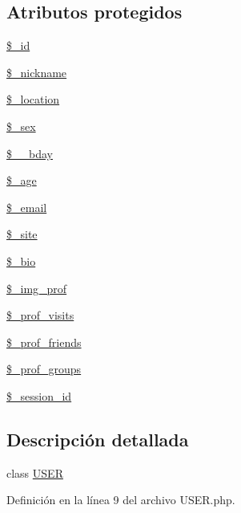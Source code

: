 \subsection*{Atributos protegidos}
\begin{DoxyCompactItemize}
\item 
\hyperlink{classUSER_a64da16c4a1c7b2dc6784f6ef26341ed7}{\$\-\_\-id}
\item 
\hyperlink{classUSER_a0791a0cc4f4f4676e8f4f94ba0516731}{\$\-\_\-nickname}
\item 
\hyperlink{classUSER_a8d591c38603c12640c6e3a6be8ad125d}{\$\-\_\-location}
\item 
\hyperlink{classUSER_a0daa294c691b0e2ab4878e2fc06b6706}{\$\-\_\-sex}
\item 
\hyperlink{classUSER_a45989f84816f9c5b99cc3b18dc23ba48}{\$\-\_\-\-\_\-bday}
\item 
\hyperlink{classUSER_a9c749fcfc61978947fbbffcb09e713c6}{\$\-\_\-age}
\item 
\hyperlink{classUSER_a945b9b37db6c8c42e784df999c9ae416}{\$\-\_\-email}
\item 
\hyperlink{classUSER_a67945a9e82178c5ceac503d9b26f39b5}{\$\-\_\-site}
\item 
\hyperlink{classUSER_a4df3a432bdd1a0da13ee36bae6db0147}{\$\-\_\-bio}
\item 
\hyperlink{classUSER_a348c29ec19b54ee09130d6b2f8cb1408}{\$\-\_\-img\-\_\-prof}
\item 
\hyperlink{classUSER_a8386ebedb107e6834cad8da7d83a8328}{\$\-\_\-prof\-\_\-visits}
\item 
\hyperlink{classUSER_aaa568e34fed9cc0bbd396dd4e5bb5958}{\$\-\_\-prof\-\_\-friends}
\item 
\hyperlink{classUSER_a5f31de3c7150ec160bd0cee74d71bb0a}{\$\-\_\-prof\-\_\-groups}
\item 
\hyperlink{classUSER_a92023c94926d17b1f6705c8b1d35a103}{\$\-\_\-session\-\_\-id}
\end{DoxyCompactItemize}


\subsection{Descripción detallada}
class \hyperlink{classUSER}{U\-S\-E\-R} 

Definición en la línea 9 del archivo U\-S\-E\-R.\-php.



